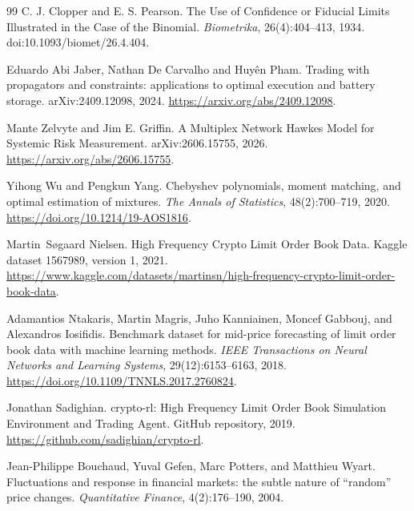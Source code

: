 \documentclass[10pt,twocolumn,letterpaper]{article}
\theoremstyle{definition}
\theoremstyle{remark}
\begin{document}
\begin{thebibliography}{99}
C. J. Clopper and E. S. Pearson.
\newblock The Use of Confidence or Fiducial Limits Illustrated in the Case of the Binomial.
\newblock \emph{Biometrika}, 26(4):404--413, 1934.
\newblock doi:10.1093/biomet/26.4.404.

Eduardo Abi Jaber, Nathan De Carvalho and Huy\^en Pham.
\newblock Trading with propagators and constraints: applications to optimal execution and battery storage.
\newblock arXiv:2409.12098, 2024.
\newblock \url{https://arxiv.org/abs/2409.12098}.

Mante Zelvyte and Jim E. Griffin.
\newblock A Multiplex Network Hawkes Model for Systemic Risk Measurement.
\newblock arXiv:2606.15755, 2026.
\newblock \url{https://arxiv.org/abs/2606.15755}.

Yihong Wu and Pengkun Yang.
\newblock Chebyshev polynomials, moment matching, and optimal estimation of mixtures.
\newblock \emph{The Annals of Statistics}, 48(2):700--719, 2020.
\newblock \url{https://doi.org/10.1214/19-AOS1816}.

Martin~S{\o}gaard Nielsen.
\newblock High Frequency Crypto Limit Order Book Data.
\newblock Kaggle dataset 1567989, version 1, 2021.
\newblock \url{https://www.kaggle.com/datasets/martinsn/high-frequency-crypto-limit-order-book-data}.

Adamantios Ntakaris, Martin Magris, Juho Kanniainen, Moncef Gabbouj, and Alexandros Iosifidis.
\newblock Benchmark dataset for mid-price forecasting of limit order book data with machine learning methods.
\newblock \emph{IEEE Transactions on Neural Networks and Learning Systems}, 29(12):6153--6163, 2018.
\newblock \url{https://doi.org/10.1109/TNNLS.2017.2760824}.

Jonathan Sadighian.
\newblock crypto-rl: High Frequency Limit Order Book Simulation Environment and Trading Agent.
\newblock GitHub repository, 2019.
\newblock \url{https://github.com/sadighian/crypto-rl}.

Jean-Philippe Bouchaud, Yuval Gefen, Marc Potters, and Matthieu Wyart.
\newblock Fluctuations and response in financial markets: the subtle nature of ``random'' price changes.
\newblock \emph{Quantitative Finance}, 4(2):176--190, 2004.


\end{thebibliography}
\end{document}
